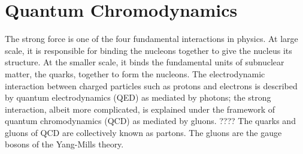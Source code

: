 
\section{Quantum Chromodynamics}\label{section:QCD}%
The strong force is one of the four fundamental interactions in physics. At large scale, it is responsible for binding the nucleons together to give the nucleus its structure. At the smaller scale, it binds the fundamental units of subnuclear matter, the quarks, together to form the nucleons. The electrodynamic interaction between charged particles such as protons and electrons is described by quantum electrodynamics (QED) as mediated by photons; the strong interaction, albeit more complicated, is explained under the framework of quantum chromodynamics (QCD) as mediated by gluons. \cite{KAPUSTA1979461, Shuryak1988} ???? The quarks and gluons of QCD are collectively known as partons. The gluons are the gauge bosons of the Yang-Mills theory.

